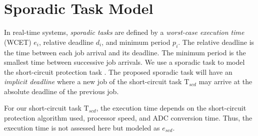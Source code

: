 \documentclass[11pt,oneside]{report}
\begin{document}
    \section*{Sporadic Task Model}
    In real-time systems, \textit{sporadic tasks} are defined by a \textit{worst-case execution time} (WCET) $e_{i}$, relative deadline $d_{i}$, and minimum period $p_{i}$. The relative deadline is the time between each job arrival and its deadline. The minimum period is the smallest time between successive job arrivals. We use a sporadic task to model the short-circuit protection task \cite{sporadicTaskModel}. The proposed sporadic task will have an \textit{implicit deadline} where a new job of the short-circuit task $\mathrm{T}_{scd}$ may arrive at the absolute deadline of the previous job.
    
    For our short-circuit task $\mathrm{T}_{scd}$, the execution time depends on the short-circuit protection algorithm used, processor speed, and ADC conversion time. Thus, the execution time is not assessed here but modeled as $e_{scd}$.
    
\end{document}
